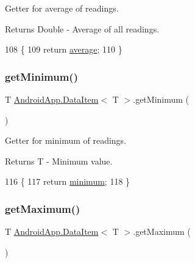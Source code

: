 Getter for average of readings. 

\begin{DoxyReturn}{Returns}
Double -\/ Average of all readings. 
\end{DoxyReturn}

\begin{DoxyCode}
108                                \{
109         \textcolor{keywordflow}{return} \hyperlink{class_android_app_1_1_data_item_a231634a35289bb35c46f7fa3111cd472}{average};
110     \}
\end{DoxyCode}
\mbox{\label{class_android_app_1_1_data_item_a1acf18ed04f82adb18ff73f4ef70b863}} 
\subsubsection{\texorpdfstring{get\+Minimum()}{getMinimum()}}
{\footnotesize\ttfamily T \hyperlink{class_android_app_1_1_data_item}{Android\+App.\+Data\+Item}$<$ T $>$.get\+Minimum (\begin{DoxyParamCaption}{ }\end{DoxyParamCaption})\hspace{0.3cm}{\ttfamily [inline]}}



Getter for minimum of readings. 

\begin{DoxyReturn}{Returns}
T -\/ Minimum value. 
\end{DoxyReturn}

\begin{DoxyCode}
116                           \{
117         \textcolor{keywordflow}{return} \hyperlink{class_android_app_1_1_data_item_a23e9e2f0dbcfe5e163cd57888ed3dbd7}{minimum};
118     \}
\end{DoxyCode}
\mbox{\label{class_android_app_1_1_data_item_abc05cb2c7e1c30a018191cb140afc948}} 
\subsubsection{\texorpdfstring{get\+Maximum()}{getMaximum()}}
{\footnotesize\ttfamily T \hyperlink{class_android_app_1_1_data_item}{Android\+App.\+Data\+Item}$<$ T $>$.get\+Maximum (\begin{DoxyParamCaption}{ }\end{DoxyParamCaption})\hspace{0.3cm}{\ttfamily [inline]}}



